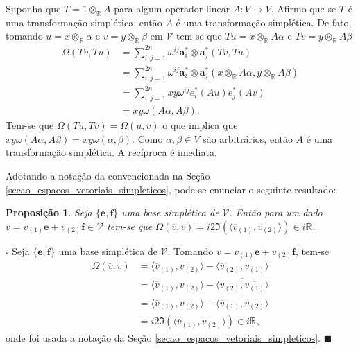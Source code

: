 \documentclass[12pt]{book}
\newtheorem{proposicao}[teorema]{Proposição}
\newenvironment{prova}[1]{$\square$ #1}{\hfill$\blacksquare$}
\newcommand{\complexificado}[1]{\mathcal{#1}}
\newcommand{\complexificacaoelemento}[2]{#1\otimes_{\reta} #2}
\newcommand{\formaSimpletica}[2]{\omega(#1, #2)}
\newcommand{\formaSimpleticaExtendida}[2]{\Omega(#1, #2)}
\newcommand{\parteImaginaria}[1]{\Im(#1)}
\newcommand{\produtointerno}[2]{\langle #1, #2 \rangle}
\newcommand{\real}[1]{\mathbb{R}^{#1}}
\newcommand{\reta}{\real{}}
\begin{document}
	Suponha que $T=\complexificacaoelemento{1}{A}$ para algum operador linear $A:V \to V$. Afirmo que se $T$ é uma transformação simplética, então $A$ é uma transformação simplética. De fato, tomando $u = \complexificacaoelemento{x}{\alpha}$ e $v=\complexificacaoelemento{y}{\beta}$ em $\complexificado{V}$ tem-se que $Tu = \complexificacaoelemento{x}{A\alpha}$ e $Tv= \complexificacaoelemento{y}{A\beta}$
	$$
	\begin{aligned}
	\Omega(Tv,Tu)
	&= \sum_{i,j = 1}^{2n}
	\omega^{ij}\textbf{a}^{*}_{i}\otimes \textbf{a}^{*}_{j}(Tv,Tu)
	\\
	&= 
	\sum_{i,j = 1}^{2n}
	\omega^{ij}\textbf{a}^{*}_{i}\otimes \textbf{a}^{*}_{j}(\complexificacaoelemento{x}{A\alpha},\complexificacaoelemento{y}{A\beta})
	\\
	&= \sum_{i,j = 1}^{2n}
	xy\omega^{ij}e^{*}_{i}(Au)e^{*}_{j}(Av)
	\\
	&= xy
	\formaSimpletica{A\alpha}{A\beta}.
	\end{aligned}
	$$  
	Tem-se que $\formaSimpleticaExtendida{Tu}{Tv} = \formaSimpleticaExtendida{u}{v}$ o que implica que $xy
	\formaSimpletica{A\alpha}{A\beta} = xy
	\formaSimpletica{\alpha}{\beta}$. Como $\alpha, \beta \in V$ são arbitrários, então $A$ é uma transformação simplética. A recíproca é imediata.
	
	Adotando a notação da convencionada na Seção \ref{secao_espacos_vetoriais_simpleticos}, pode-se enunciar o seguinte resultado:
	
	\begin{proposicao}\label{proposicao_forma_simpletica_vetor_conjugado}
		Seja $\{\textbf{e}, \textbf{f}\}$ uma base simplética de $\complexificado{V}$. Então para um dado $v = v_{(1)}\textbf{e}+v_{(2)}\textbf{f} \in \complexificado{V}$ tem-se que $\formaSimpleticaExtendida{\overline{v}}{v}
		=i2\parteImaginaria{\produtointerno{\overline{v}_{(1)}}{v_{(2)}}} \in i\reta$.
	\end{proposicao}
	\begin{prova}
		Seja $\{\textbf{e}, \textbf{f} \}$ uma base simplética de $\complexificado{V}$. Tomando $v = v_{(1)}\textbf{e}+v_{(2)}\textbf{f}$, tem-se
		$$
		\begin{aligned}
		\formaSimpleticaExtendida{\overline{v}}{v} 
		&= \produtointerno{\overline{v}_{(1)}}{v_{(2)}}- \produtointerno{\overline{v}_{(2)}}{v_{(1)}}
		\\
		&= \produtointerno{\overline{v}_{(1)}}{v_{(2)}}- \overline{\produtointerno{v_{(2)}}{\overline{v_{(1)}}}}
		\\
		&= \produtointerno{\overline{v}_{(1)}}{v_{(2)}}-\overline{ \produtointerno{\overline{v}_{(1)}}{v_{(2)}}}
		\\
		&=i2\parteImaginaria{\produtointerno{\overline{v}_{(1)}}{v_{(2)}}}\in i\reta,
		\end{aligned}
		$$
		onde foi usada a notação da Seção \ref{secao_espacos_vetoriais_simpleticos}.
	\end{prova}
		
\end{document}
